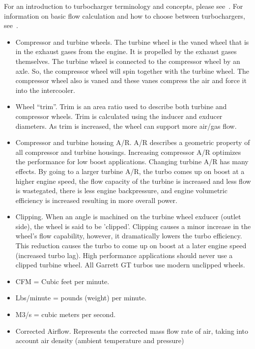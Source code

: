 \documentclass[11pt,a4paper]{book}
\begin{document}
For an introduction to turbocharger terminology and concepts, please
see~\textcite{GarrettTerminology}. For information on basic flow calculation and how
to choose between turbochargers, see~\textcite{Isaac-Lowry2004}.
\begin{itemize}
    \item Compressor and turbine wheels. The turbine wheel is the vaned wheel
        that is in the exhaust gases from the engine. It is propelled by the
        exhaust gases themselves. The turbine wheel is connected to the
        compressor wheel by an axle. So, the compressor wheel will spin together
        with the turbine wheel. The compressor wheel also is vaned and these
        vanes compress the air and force it into the intercooler.
    \item Wheel “trim”. Trim is an area ratio used to describe both turbine and
        compressor wheels. Trim is calculated using the inducer and exducer
        diameters. As trim is increased, the wheel can support more air/gas flow.
    \item Compressor and turbine housing A/R. A/R describes a geometric property of
        all compressor and turbine housings. Increasing compressor A/R optimizes the
        performance for low boost applications. Changing turbine A/R has many
        effects. By going to a larger turbine A/R, the turbo comes up on boost at a
        higher engine speed, the flow capacity of the turbine is increased and less
        flow is wastegated, there is less engine backpressure, and engine volumetric
        efficiency is increased resulting in more overall power.
    \item Clipping. When an angle is machined on the turbine wheel exducer (outlet
        side), the wheel is said to be 'clipped'. Clipping causes a minor increase
        in the wheel's flow capability, however, it dramatically lowers the turbo
        efficiency. This reduction causes the turbo to come up on boost at a
        later engine speed (increased turbo lag). High performance applications
        should never use a clipped turbine wheel. All Garrett GT turbos use
        modern unclipped wheels.
    \item CFM = Cubic feet per minute.
    \item Lbs/minute = pounds (weight) per minute.
    \item M3/s = cubic meters per second.
    \item Corrected Airflow. Represents the corrected mass flow rate of air,
        taking into account air density (ambient temperature and pressure)


\end{itemize}
\end{document}
